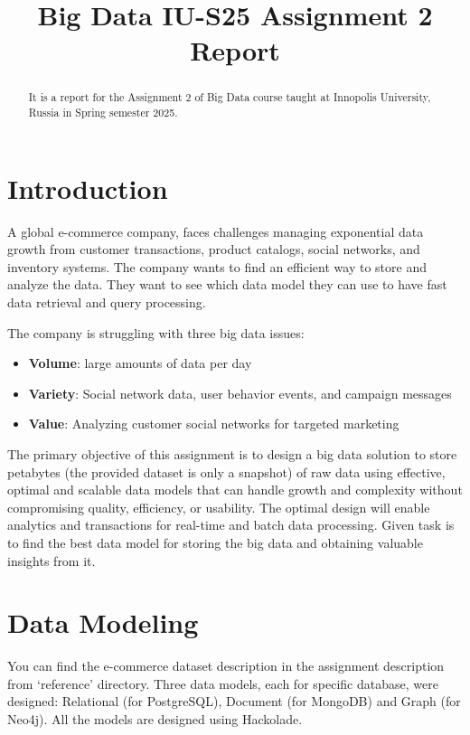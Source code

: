 \documentclass[conference]{IEEEtran}
\begin{document}
\title{Big Data IU-S25 Assignment 2 Report}

\author{
}

\maketitle

\begin{abstract}
    It is a report  for the Assignment 2 of Big Data course taught at
    Innopolis University, Russia in Spring semester 2025.
\end{abstract}


\section{Introduction}
A global e-commerce company, faces challenges managing exponential data growth from customer transactions, product catalogs, social networks, and inventory systems. The company wants to find an efficient way to store and analyze the data. They want to see which data model they can use to have fast data retrieval and query processing.

The company is struggling with three big data issues:
\begin{itemize}
    \item \textbf{Volume}: large amounts of data per day
    \item \textbf{Variety}: Social network data, user behavior events, and campaign messages
    \item \textbf{Value}: Analyzing customer social networks for targeted marketing
\end{itemize}

The primary objective of this assignment is to design a big data solution to store petabytes (the provided dataset is only a snapshot) of raw data using effective, optimal and scalable data models that can handle growth and complexity without compromising quality, efficiency, or usability. The optimal design will enable analytics and transactions for real-time and batch data processing. Given task is to find the best data model for storing the big data and obtaining valuable insights from it.

\section{Data Modeling}
You can find the e-commerce dataset description in the assignment description from `reference' directory. Three data models, each for specific database, were designed: Relational (for PostgreSQL), Document (for MongoDB) and Graph (for Neo4j). All the models are designed using Hackolade.
\end{document}
